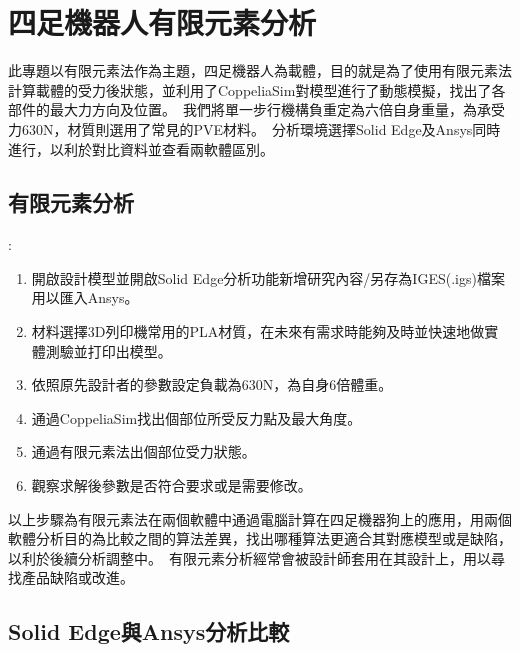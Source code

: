 \chapter{四足機器人有限元素分析}

此專題以有限元素法作為主題，四足機器人為載體，目的就是為了使用有限元素法計算載體的受力後狀態，並利用了CoppeliaSim對模型進行了動態模擬，找出了各部件的最大力方向及位置。\
我們將單一步行機構負重定為六倍自身重量，為承受力630N，材質則選用了常見的PVE材料。\
分析環境選擇Solid Edge及Ansys同時進行，以利於對比資料並查看兩軟體區別。\\

\section{有限元素分析}
\begin{itemize}
:
  \begin{enumerate}
  \item 開啟設計模型並開啟Solid Edge分析功能新增研究內容/另存為IGES(.igs)檔案用以匯入Ansys。
  \item 材料選擇3D列印機常用的PLA材質，在未來有需求時能夠及時並快速地做實體測驗並打印出模型。
  \item 依照原先設計者的參數設定負載為630N，為自身6倍體重。
  \item 通過CoppeliaSim找出個部位所受反力點及最大角度。
  \item 通過有限元素法出個部位受力狀態。
  \item 觀察求解後參數是否符合要求或是需要修改。
  \end {enumerate}
\end{itemize}

以上步驟為有限元素法在兩個軟體中通過電腦計算在四足機器狗上的應用，用兩個軟體分析目的為比較之間的算法差異，找出哪種算法更適合其對應模型或是缺陷，以利於後續分析調整中。\
有限元素分析經常會被設計師套用在其設計上，用以尋找產品缺陷或改進。\
\newpage
\section{Solid Edge與Ansys分析比較}

\newpage

